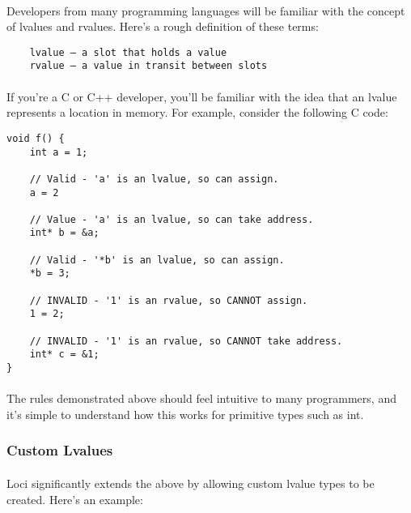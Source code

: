 \documentclass[12pt,twoside,notitlepage]{report}
\begin{document}
\paragraph{}
Developers from many programming languages will be familiar with the concept of lvalues and rvalues. Here’s a rough definition of these terms:

\begin{lstlisting}
	lvalue – a slot that holds a value
	rvalue – a value in transit between slots
\end{lstlisting}

\paragraph{}
If you're a C or C++ developer, you’ll be familiar with the idea that an lvalue represents a location in memory. For example, consider the following C code:

\begin{lstlisting}
void f() {
	int a = 1;
 
	// Valid - 'a' is an lvalue, so can assign.
	a = 2
 
	// Value - 'a' is an lvalue, so can take address.
	int* b = &a;
 
	// Valid - '*b' is an lvalue, so can assign.
	*b = 3;
 
	// INVALID - '1' is an rvalue, so CANNOT assign.
	1 = 2;
 
	// INVALID - '1' is an rvalue, so CANNOT take address.
	int* c = &1;
}
\end{lstlisting}

\paragraph{}
The rules demonstrated above should feel intuitive to many programmers, and it’s simple to understand how this works for primitive types such as int.

\subsubsection{Custom Lvalues}

\paragraph{}
Loci significantly extends the above by allowing custom lvalue types to be created. Here’s an example:
\end{document}

